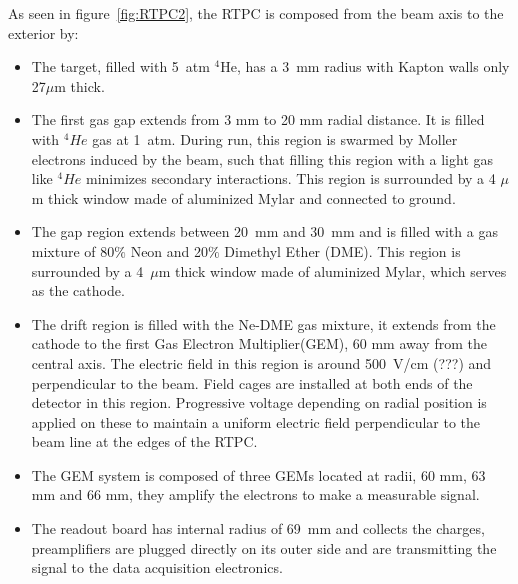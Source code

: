 \documentclass[aps,prl,twocolumn,showpacs,superscriptaddress,groupedaddress]{revtex4}
\begin{document}
As seen in figure~\ref{fig:RTPC2}, the RTPC is composed from the beam axis to 
the exterior by:\\
\begin{itemize}
   \item The target, filled with 5~atm $^4$He, has a 3~mm radius with Kapton 
      walls only 27$\mu$m thick.

   \item The first gas gap extends from 3 mm to 20 mm radial distance. It is 
   filled with $^{4}He$ gas at 1~atm. During run, this region is swarmed by 
   Moller electrons induced by the beam, such that filling this region with a 
   light gas like $^{4}He$ minimizes secondary interactions. This region is 
   surrounded by a 4 $\mu$m thick window made of aluminized Mylar and connected 
to ground.                                                                 

   \item The gap region extends between 20~mm and 30~mm and is filled with a 
      gas mixture of 80$\%$ Neon and 20$\%$ Dimethyl Ether (DME).  This region 
      is surrounded by a 4~$\mu$m thick window made of aluminized Mylar, which 
      serves as the cathode.

   \item The drift region is filled with the Ne-DME gas mixture, it extends 
      from the cathode to the first Gas Electron Multiplier(GEM), 60 mm away 
      from the central axis. The electric field in this region is around 
      500~V/cm (???) and perpendicular to the beam. Field cages are installed 
      at both ends of the detector in this region. Progressive voltage 
      depending on radial position is applied on these to maintain a uniform 
      electric field perpendicular to the beam line at the edges of the RTPC.
   
   \item The GEM system is composed of three GEMs located at radii, 60 mm, 63 
      mm and 66 mm, they amplify the electrons to make a measurable signal.

   \item The readout board has internal radius of 69~mm and collects the 
      charges, preamplifiers are plugged directly on its outer side and are 
      transmitting the signal to the data acquisition electronics.
\end{itemize}
\end{document}
